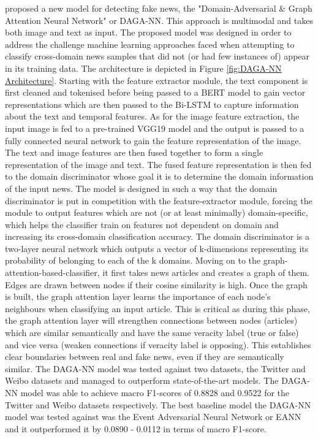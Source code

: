 \documentclass[stu,12pt,floatsintext,donotrepeattitle]{apa7}
\begin{document}

\parencite{graph-attention-multimodal} proposed a new model for detecting fake news, the "Domain-Adversarial \& Graph Attention Neural Network" or DAGA-NN. This approach is multimodal and takes both image and text as input. The proposed model was designed in order to address the challenge machine learning approaches faced when attempting to classify cross-domain news samples that did not (or had few instances of) appear in its training data. The architecture is depicted in Figure \ref{fig:DAGA-NN Architecture}. Starting with the feature extractor module, the text component is first cleaned and tokenised before being passed to a BERT model to gain vector representations which are then passed to the Bi-LSTM to capture information about the text and temporal features. As for the image feature extraction, the input image is fed to a pre-trained VGG19 model and the output is passed to a fully connected neural network to gain the feature representation of the image. The text and image features are then fused together to form a single representation of the image and text. The fused feature representation is then fed to the domain discriminator whose goal it is to determine the domain information of the input news. The model is designed in such a way that the domain discriminator is put in competition with the feature-extractor module, forcing the module to output features which are not (or at least minimally) domain-specific, which helps the classifier train on features not dependent on domain and increasing its cross-domain classification accuracy. The domain discriminator is a two-layer neural network which outputs a vector of k-dimensions representing its probability of belonging to each of the k domains. Moving on to the graph-attention-based-classifier, it first takes news articles and creates a graph of them. Edges are drawn between nodes if their cosine similarity is high. Once the graph is built, the graph attention layer learns the importance of each node's neighbours when classifying an input article. This is critical as during this phase, the graph attention layer will strengthen connections between nodes (articles) which are similar semantically and have the same veracity label (true or false) and vice versa (weaken connections if veracity label is opposing). This establishes clear boundaries between real and fake news, even if they are semantically similar. The DAGA-NN model was tested against two datasets, the Twitter and Weibo datasets and managed to outperform state-of-the-art models. The DAGA-NN model was able to achieve macro F1-scores of 0.8828 and 0.9522 for the Twitter and Weibo datasets respectively. The best baseline model the DAGA-NN model was tested against was the Event Adversarial Neural Network or EANN and it outperformed it by 0.0890 - 0.0112 in terms of macro F1-score. 
\end{document}
